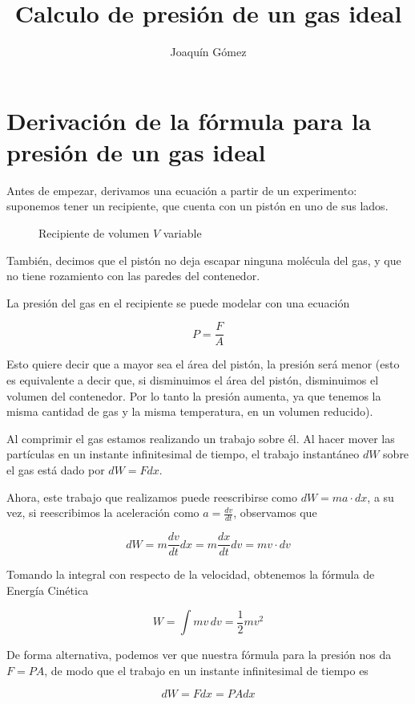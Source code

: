 \documentclass{article}
\title{Calculo de presión de un gas ideal}
\author{Joaquín Gómez}
\begin{document}
\maketitle

\section*{Derivación de la fórmula para la presión de un gas ideal}

Antes de empezar, derivamos una ecuación a partir de un experimento: suponemos
tener un recipiente, que cuenta con un pistón en uno de sus lados.

\begin{figure}[h]
  \centering
  \caption{Recipiente de volumen $V$ variable}
  
\end{figure}

También, decimos que el pistón no deja escapar ninguna molécula del gas, y que
no tiene rozamiento con las paredes del contenedor.

La presión del gas en el recipiente se puede modelar con una ecuación

\[
  P = \frac F A
\]

Esto quiere decir que a mayor sea el área del pistón, la presión será menor
(esto es equivalente a decir que, si disminuimos el área del pistón,
disminuimos el volumen del contenedor. Por lo tanto la presión aumenta, ya que
tenemos la misma cantidad de gas y la misma temperatura, en un volumen
reducido).

Al comprimir el gas estamos realizando un trabajo sobre él. Al hacer mover las
partículas en un instante infinitesimal de tiempo, el trabajo instantáneo $dW$
sobre el gas está dado por $dW=Fdx$.

Ahora, este trabajo que realizamos puede reescribirse como $dW=ma\cdot dx$, a
su vez, si reescribimos la aceleración como $a = \frac {dv}{dt}$, observamos
que

\[
  dW = m \frac{dv}{dt} dx = m \frac{dx}{dt}dv = mv \cdot dv
\]

Tomando la integral con respecto de la velocidad, obtenemos la fórmula de
Energía Cinética

\[
  W = \int {mv\,dv}= \frac 1 2 m v^2
\]

De forma alternativa, podemos ver que nuestra fórmula para la presión nos da
$F=PA$, de modo que el trabajo en un instante infinitesimal de tiempo es

\[
  dW=Fdx=PAdx
\]
\end{document}
